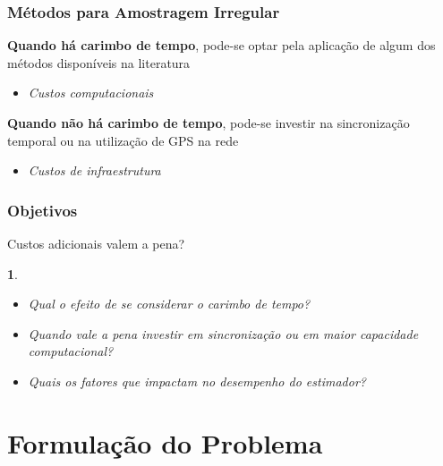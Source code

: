 \documentclass{beamer}
\renewcommand{\(}{\left(}
\renewcommand{\)}{\right)}
\renewcommand{\[}{\left[}
\renewcommand{\]}{\right]}
\newtheorem{definicao}{}
\begin{document}

\begin{frame}
	\frametitle{Métodos para Amostragem Irregular}
	
	\textbf{Quando há carimbo de tempo}, pode-se optar pela aplicação de algum dos métodos disponíveis na literatura
	\begin{itemize}
		\item \textit{Custos computacionais}
	\end{itemize}
	
	\vspace{0.5cm}
	
	\textbf{Quando não há carimbo de tempo}, pode-se investir na sincronização temporal ou na utilização de GPS na rede
	\begin{itemize}
		\item \textit{Custos de infraestrutura}
	\end{itemize}

\end{frame}


\begin{frame}
	\frametitle{Objetivos}
	
	Custos adicionais valem a pena?
	\vspace{0.3cm}
	
	
	\begin{definicao}	
		\begin{itemize}
			\item Qual o efeito de se considerar o carimbo de tempo?
			\vspace{0.5cm}
			\item Quando vale a pena investir em sincronização ou em maior capacidade computacional?
			\vspace{0.5cm}
			\item Quais os fatores que impactam no desempenho do estimador?
		\end{itemize}
	\end{definicao}

\end{frame}


\section{Formulação do Problema} 
\end{document}
